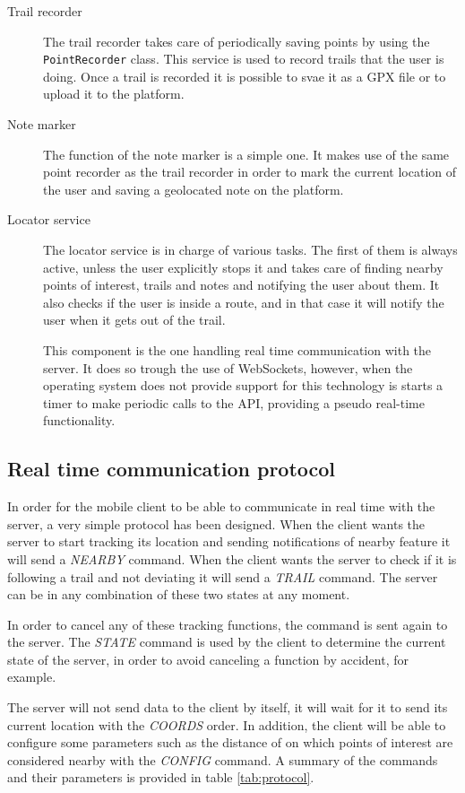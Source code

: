 \begin{description}
\item[Trail recorder] The trail recorder takes care of periodically saving points by using the \texttt{PointRecorder} class. This service is used to record trails that the user is doing. Once a trail is recorded it is possible to svae it as a GPX file or to upload it to the platform.
\item[Note marker] The function of the note marker is a simple one. It makes use of the same point recorder as the trail recorder in order to mark the current location of the user and saving a geolocated note on the platform.
\item[Locator service] The locator service is in charge of various tasks. The first of them is always active, unless the user explicitly stops it and takes care of finding nearby points of interest, trails and notes and notifying the user about them. It also checks if the user is inside a route, and in that case it will notify the user when it gets out of the trail.

This component is the one handling real time communication with the server. It does so trough the use of WebSockets, however, when the operating system does not provide support for this technology is starts a timer to make periodic calls to the API, providing a pseudo real-time functionality.
\end{description}

\subsection{Real time communication protocol}\label{sec:protocol}

In order for the mobile client to be able to communicate in real time with the server, a very simple protocol has been designed. When the client wants the server to start tracking its location and sending notifications of nearby feature it will send a \textit{NEARBY} command. When the client wants the server to check if it is following a trail and not deviating it will send a \textit{TRAIL} command. The server can be in any combination of these two states at any moment.

In order to cancel any of these tracking functions, the command is sent again to the server. The \textit{STATE} command is used by the client to determine the current state of the server, in order to avoid canceling a function by accident, for example.

The server will not send data to the client by itself, it will wait for it to send its current location with the \textit{COORDS} order. In addition, the client will be able to configure some parameters such as the distance of on which points of interest are considered nearby with the \textit{CONFIG} command. A summary of the commands and their parameters is provided in table \ref{tab:protocol}.

